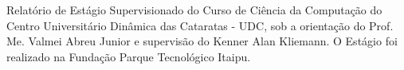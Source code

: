 \begin{center}
	\vspace{180pt}
\end{center}

\vspace{20pt}

\begin{flushright}
\begin{minipage}[c]{0.66\columnwidth}
Relatório de Estágio Supervisionado do Curso de Ciência da Computação do Centro Universitário Dinâmica das Cataratas - UDC, sob a orientação do Prof. Me. Valmei Abreu Junior e supervisão do Kenner Alan Kliemann. O Estágio foi realizado na Fundação Parque Tecnológico Itaipu.

\vspace{1cm}

\end{minipage}
\end{flushright}
\begin{center}
\par\vfill
{}
\end{center}
\thispagestyle{empty} 
